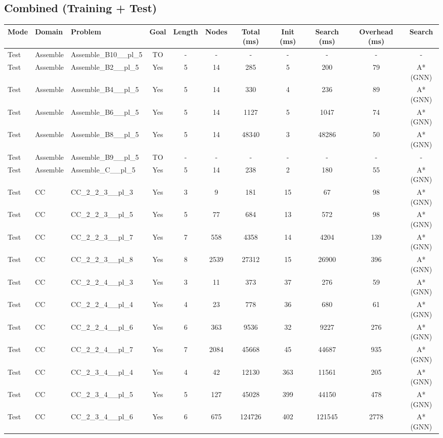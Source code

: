 \documentclass{article}
\begin{document}
\subsection*{Combined (Training + Test)}
\begin{tabular}{lllcccccccc}
\toprule
Mode & Domain & Problem & Goal & Length & Nodes & Total (ms) & Init (ms) & Search (ms) & Overhead (ms) & Search \\
\midrule
Test & Assemble & Assemble\_B10\_\_pl\_5 & TO & - & - & - & - & - & - & - \\
Test & Assemble & Assemble\_B2\_\_pl\_5 & Yes & 5 & 14 & 285 & 5 & 200 & 79 & A*(GNN) \\
Test & Assemble & Assemble\_B4\_\_pl\_5 & Yes & 5 & 14 & 330 & 4 & 236 & 89 & A*(GNN) \\
Test & Assemble & Assemble\_B6\_\_pl\_5 & Yes & 5 & 14 & 1127 & 5 & 1047 & 74 & A*(GNN) \\
Test & Assemble & Assemble\_B8\_\_pl\_5 & Yes & 5 & 14 & 48340 & 3 & 48286 & 50 & A*(GNN) \\
Test & Assemble & Assemble\_B9\_\_pl\_5 & TO & - & - & - & - & - & - & - \\
Test & Assemble & Assemble\_C\_\_pl\_5 & Yes & 5 & 14 & 238 & 2 & 180 & 55 & A*(GNN) \\
Test & CC & CC\_2\_2\_3\_\_pl\_3 & Yes & 3 & 9 & 181 & 15 & 67 & 98 & A*(GNN) \\
Test & CC & CC\_2\_2\_3\_\_pl\_5 & Yes & 5 & 77 & 684 & 13 & 572 & 98 & A*(GNN) \\
Test & CC & CC\_2\_2\_3\_\_pl\_7 & Yes & 7 & 558 & 4358 & 14 & 4204 & 139 & A*(GNN) \\
Test & CC & CC\_2\_2\_3\_\_pl\_8 & Yes & 8 & 2539 & 27312 & 15 & 26900 & 396 & A*(GNN) \\
Test & CC & CC\_2\_2\_4\_\_pl\_3 & Yes & 3 & 11 & 373 & 37 & 276 & 59 & A*(GNN) \\
Test & CC & CC\_2\_2\_4\_\_pl\_4 & Yes & 4 & 23 & 778 & 36 & 680 & 61 & A*(GNN) \\
Test & CC & CC\_2\_2\_4\_\_pl\_6 & Yes & 6 & 363 & 9536 & 32 & 9227 & 276 & A*(GNN) \\
Test & CC & CC\_2\_2\_4\_\_pl\_7 & Yes & 7 & 2084 & 45668 & 45 & 44687 & 935 & A*(GNN) \\
Test & CC & CC\_2\_3\_4\_\_pl\_4 & Yes & 4 & 42 & 12130 & 363 & 11561 & 205 & A*(GNN) \\
Test & CC & CC\_2\_3\_4\_\_pl\_5 & Yes & 5 & 127 & 45028 & 399 & 44150 & 478 & A*(GNN) \\
Test & CC & CC\_2\_3\_4\_\_pl\_6 & Yes & 6 & 675 & 124726 & 402 & 121545 & 2778 & A*(GNN) \\

\end{tabular}
\end{document}
